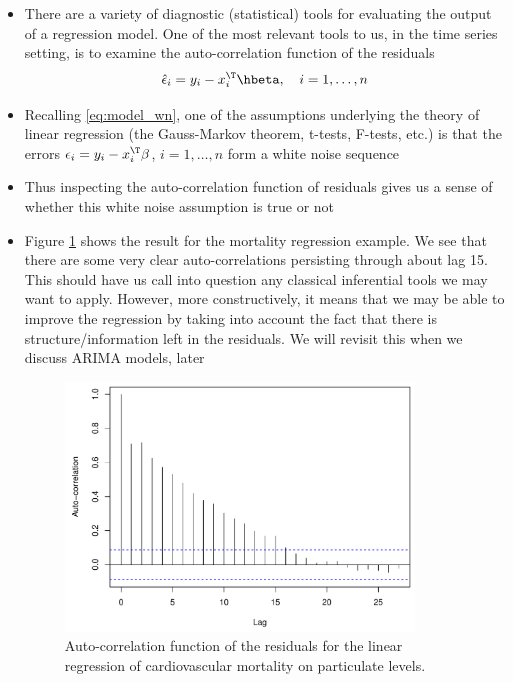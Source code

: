 \documentclass{article}
\begin{document}
\begin{itemize}
\item There are a variety of diagnostic (statistical) tools for evaluating the
  output of a regression model. One of the most relevant tools to us, in the 
  time series setting, is to examine the auto-correlation function of the 
  residuals   
  \[
  \hat\epsilon_i = y_i - x_i^\T \hbeta, \quad i = 1,\dots,n
  \]
  
\item Recalling \eqref{eq:model_wn}, one of the assumptions underlying the
  theory of linear regression (the Gauss-Markov theorem, t-tests, F-tests, etc.)
  is that the errors $\epsilon_i = y_i - x_i^\T \beta$, $i = 1,\dots,n$ form a 
  white noise sequence  

\item Thus inspecting the auto-correlation function of residuals gives us a
  sense of whether this white noise assumption is true or not

\item Figure \ref{fig:cardio_acf} shows the result for the mortality regression
  example. We see that there are some very clear auto-correlations persisting  
  through about lag 15. This should have us call into question any classical
  inferential tools we may want to apply. However, more constructively, it means
  that we may be able to improve the regression by taking into account the fact
  that there is structure/information left in the residuals. We will revisit
  this when we discuss ARIMA models, later 

\begin{figure}[htb]
\centering
\includegraphics[width=0.875\textwidth]{fig/cardio-mult-4.pdf} 
\caption{Auto-correlation function of the residuals for the linear regression of
  cardiovascular mortality on particulate levels.}
\label{fig:cardio_acf}
\end{figure}


\end{itemize}
\end{document}
